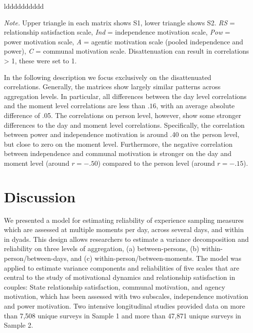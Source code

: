 \documentclass[jou,a4paper,draftfirst]{apa6}\usepackage[]{graphicx}\usepackage[]{color}
\begin{document}
\begin{table*}
\begin{threeparttable}
\begin{tabular}{ldddddddddd}
 	
			\midrule
		\end{tabular}
		\begin{tablenotes}[para,flushleft]
			{\small
			\textit{Note.} Upper triangle in each matrix shows S1, lower triangle shows S2. \emph{RS} = relationship satisfaction scale, \emph{Ind} = independence motivation scale, \emph{Pow} = power motivation scale, \emph{A} = agentic motivation scale (pooled independence and power), \emph{C} = communal motivation scale. Disattenuation can result in correlations > 1, these were set to 1.}
	      \end{tablenotes}
	  \end{threeparttable}
\end{table*}	


In the following description we focus exclusively on the disattenuated correlations. Generally, the matrices show largely similar patterns across aggregation levels. In particular, all differences between the day level correlations and the moment level correlations are less than $.16$, with an average absolute difference of .05. The correlations on person level, however, show some stronger differences to the day and moment level correlations. Specifically, the correlation between power and independence motivation is around .40 on the person level, but close to zero on the moment level. Furthermore, the negative correlation between independence and communal motivation is stronger on the day and moment level (around $r = -.50$) compared to the person level (around $r = -.15$).


\section{Discussion}

We presented a model for estimating reliability of experience sampling measures which are assessed at multiple moments per day, across several days, and within in dyads. This design allows researchers to estimate a variance decomposition and reliability on three levels of aggregation, (a) between-persons, (b) within-person/between-days, and (c) within-person/between-moments.
The model was applied to estimate variance components and reliabilities of five scales that are central to the study of motivational dynamics and relationship satisfaction in couples: State relationship satisfaction, communal motivation, and agency motivation, which has been assessed with two subscales, independence motivation and power motivation. Two intensive longitudinal studies provided data on more than 7,508 unique surveys in Sample 1 and more than 47,871 unique surveys in Sample 2.
\end{document}
